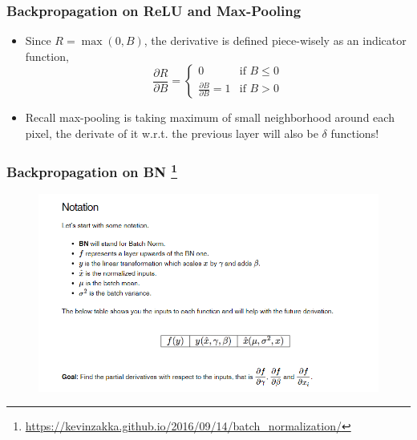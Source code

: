 \documentclass[10pt]{beamer}
\begin{document}
\begin{frame}
\frametitle{Backpropagation on ReLU and Max-Pooling}
\begin{itemize}
	\item Since $R = \max(0,B)$, the derivative is defined piece-wisely as an indicator function,
	\[
	\frac{\partial R}{\partial B} = \begin{cases} 0 &\mbox{if } B\leq 0 \\ 
	\frac{\partial B}{\partial B} = 1 & \mbox{if } B>0 \end{cases}  
	\]
	\item Recall max-pooling is taking maximum of small neighborhood around each pixel, the derivate of it w.r.t. the previous layer will also be $\delta$ functions!
\end{itemize}
\end{frame}


\begin{frame}
\frametitle{Backpropagation on BN \footnote{\url{https://kevinzakka.github.io/2016/09/14/batch_normalization/}}}
	\begin{figure}[H]
	\centerline{
		\includegraphics[width=1\textwidth]{back_bn.png}
	}
\end{figure}
\end{frame}
\end{document}
